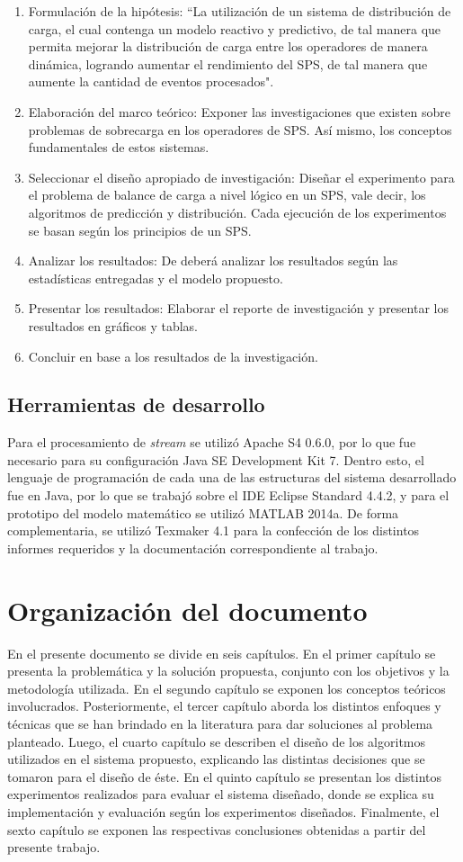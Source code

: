 \begin{enumerate}
	\item Formulación de la hipótesis: ``La utilización de un sistema de distribución de carga, el cual contenga un modelo reactivo y predictivo, de tal manera que permita mejorar la distribución de carga entre los operadores de manera dinámica, logrando aumentar el rendimiento del SPS, de tal manera que aumente la cantidad de eventos procesados".
	\item Elaboración del marco teórico: Exponer las investigaciones que existen sobre problemas de sobrecarga en los operadores de SPS. Así mismo, los conceptos fundamentales de estos sistemas.
	\item Seleccionar el diseño apropiado de investigación: Diseñar el experimento para el problema de balance de carga a nivel lógico en un SPS, vale decir, los algoritmos de predicción y distribución. Cada ejecución de los experimentos se basan según los principios de un SPS.
	\item Analizar los resultados: De deberá analizar los resultados según las estadísticas entregadas y el modelo propuesto.
	\item Presentar los resultados: Elaborar el reporte de investigación y presentar los resultados en gráficos y tablas.
	\item Concluir en base a los resultados de la investigación.
\end{enumerate}

\subsection{Herramientas de desarrollo}
Para el procesamiento de \textit{stream} se utilizó Apache S4 0.6.0, por lo que fue necesario para su configuración Java SE Development Kit 7. Dentro esto, el lenguaje de programación de cada una de las estructuras del sistema desarrollado fue en Java, por lo que se trabajó sobre el IDE Eclipse Standard 4.4.2, y para el prototipo del modelo matemático se utilizó MATLAB 2014a. De forma complementaria, se utilizó Texmaker 4.1 para la confección de los distintos informes requeridos y la documentación correspondiente al trabajo.

\section{Organización del documento}
\label{intro:organizacion}
En el presente documento se divide en seis capítulos. En el primer capítulo se presenta la problemática y la solución propuesta, conjunto con los objetivos y la metodología utilizada. En el segundo capítulo se exponen los conceptos teóricos involucrados. Posteriormente, el tercer capítulo aborda los distintos enfoques y técnicas que se han brindado en la literatura para dar soluciones al problema planteado. Luego, el cuarto capítulo se describen el diseño de los algoritmos utilizados en el sistema propuesto, explicando las distintas decisiones que se tomaron para el diseño de éste. En el quinto capítulo se presentan los distintos experimentos realizados para evaluar el sistema diseñado, donde se explica su implementación y evaluación según los experimentos diseñados. Finalmente, el sexto capítulo se exponen las respectivas conclusiones obtenidas a partir del presente trabajo.